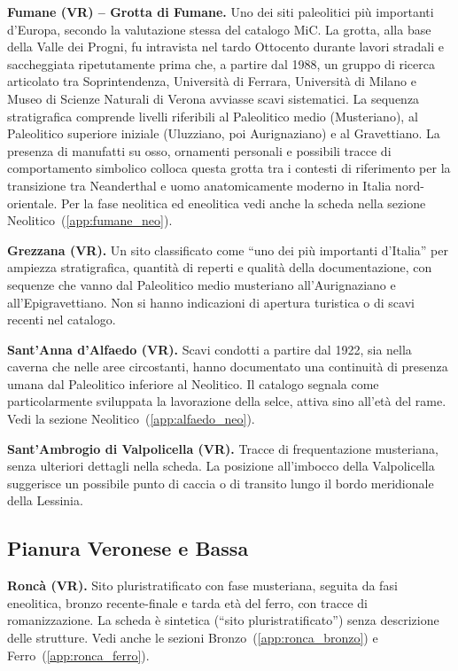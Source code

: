 \textbf{Fumane (VR) -- Grotta di Fumane.} \label{app:fumane_paleo} Uno dei siti paleolitici più importanti d'Europa, secondo la valutazione stessa del catalogo MiC. La grotta, alla base della Valle dei Progni, fu intravista nel tardo Ottocento durante lavori stradali e saccheggiata ripetutamente prima che, a partire dal 1988, un gruppo di ricerca articolato tra Soprintendenza, Università di Ferrara, Università di Milano e Museo di Scienze Naturali di Verona avviasse scavi sistematici. La sequenza stratigrafica comprende livelli riferibili al Paleolitico medio (Musteriano), al Paleolitico superiore iniziale (Uluzziano, poi Aurignaziano) e al Gravettiano. La presenza di manufatti su osso, ornamenti personali e possibili tracce di comportamento simbolico colloca questa grotta tra i contesti di riferimento per la transizione tra Neanderthal e uomo anatomicamente moderno in Italia nord-orientale. Per la fase neolitica ed eneolitica vedi anche la scheda nella sezione Neolitico~(\ref{app:fumane_neo}).

\textbf{Grezzana (VR).} Un sito classificato come ``uno dei più importanti d'Italia'' per ampiezza stratigrafica, quantità di reperti e qualità della documentazione, con sequenze che vanno dal Paleolitico medio musteriano all'Aurignaziano e all'Epigravettiano. Non si hanno indicazioni di apertura turistica o di scavi recenti nel catalogo.

\textbf{Sant'Anna d'Alfaedo (VR).} Scavi condotti a partire dal 1922, sia nella caverna che nelle aree circostanti, hanno documentato una continuità di presenza umana dal Paleolitico inferiore al Neolitico. Il catalogo segnala come particolarmente sviluppata la lavorazione della selce, attiva sino all'età del rame. Vedi la sezione Neolitico~(\ref{app:alfaedo_neo}).

\textbf{Sant'Ambrogio di Valpolicella (VR).} Tracce di frequentazione musteriana, senza ulteriori dettagli nella scheda. La posizione all'imbocco della Valpolicella suggerisce un possibile punto di caccia o di transito lungo il bordo meridionale della Lessinia.

\subsection{Pianura Veronese e Bassa}

\textbf{Roncà (VR).} \label{app:ronca_paleo} Sito pluristratificato con fase musteriana, seguita da fasi eneolitica, bronzo recente-finale e tarda età del ferro, con tracce di romanizzazione. La scheda è sintetica (``sito pluristratificato'') senza descrizione delle strutture. Vedi anche le sezioni Bronzo~(\ref{app:ronca_bronzo}) e Ferro~(\ref{app:ronca_ferro}).

